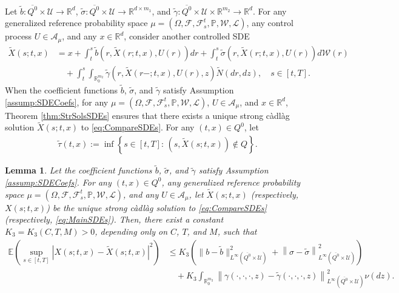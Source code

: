 \documentclass[amscd,amssymb,11pt]{article}
\newtheorem{lemma}[theorem]{Lemma}
\numberwithin{theorem}{section}
\numberwithin{equation}{section}
\begin{document}
Let $\tilde{b}:\overline{Q^{0}}\times\mathcal{U}\rightarrow\mathbb{R}^{d}$, $\widetilde{\sigma}:\overline{Q^{0}}\times\mathcal{U}\rightarrow\mathbb{R}^{d\times m_{1}}$, and $\widetilde{\gamma}:\overline{Q^{0}}\times\mathcal{U}\times\mathbb{R}^{m_{2}}\rightarrow\mathbb{R}^{d}$. For any generalized reference probability space $\mu=(\Omega,\mathscr{F},\mathscr{F}_{s}^{t},\mathbb{P},\mathcal{W},\mathcal{L})$, any control process $U\in\mathcal{A}_{\mu}$, and any $x\in\mathbb{R}^{d}$, consider another controlled SDE
\begin{align}
\widetilde{X}(s;t,x)&=x+\int_{t}^{s}\tilde{b}\left(r,\widetilde{X}(r;t,x),U(r)\right)dr+\int_{t}^{s}\widetilde{\sigma}\left(r,\widetilde{X}(r;t,x),U(r)\right)d\mathcal{W}(r)\nonumber\\
\label{eq:CompareSDEs} &\quad +\int_{t}^{s}\int_{\mathbb{R}^{m_{2}}_{0}}\widetilde{\gamma}\left(r,\widetilde{X}(r-;t,x),U(r),z\right)\widetilde{N}(dr,dz),\quad s\in[t,T].
\end{align}
When the coefficient functions $\tilde{b}$, $\widetilde{\sigma}$, and $\widetilde{\gamma}$ satisfy Assumption \ref{assump:SDECoefs}, for any $\mu=(\Omega,\mathscr{F},\mathscr{F}_{s}^{t},\mathbb{P},\mathcal{W},\mathcal{L})$, $U\in\mathcal{A}_{\mu}$, and $x\in\mathbb{R}^{d}$, Theorem \ref{thm:StrSolsSDEs} ensures that there exists a unique strong c\`{a}dl\`{a}g solution $\widetilde{X}(s;t,x)$ to \eqref{eq:CompareSDEs}. For any $(t,x)\in Q^{0}$, let
\begin{align*}
\widetilde{\tau}(t,x):=\inf\left\{s\in[t,T]:\,\left(s,\widetilde{X}(s;t,x)\right)\not\in Q\right\}.
\end{align*}
\begin{lemma}\label{lem:CompStrSols}
Let the coefficient functions $\tilde{b}$, $\widetilde{\sigma}$, and $\widetilde{\gamma}$ satisfy Assumption \ref{assump:SDECoefs}. For any $(t,x)\in Q^{0}$, any generalized reference probability space $\mu=(\Omega,\mathscr{F},\mathscr{F}_{s}^{t},\mathbb{P},\mathcal{W},\mathcal{L})$, and any $U\in\mathcal{A}_{\mu}$, let $\widetilde{X}(s;t,x)$ (respectively, $X(s;t,x)$) be the unique strong c\`{a}dl\`{a}g solution to \eqref{eq:CompareSDEs} (respectively, \eqref{eq:MainSDEs}). Then, there exist a constant $K_{3}=K_{3}(C,T,M)>0$, depending only on $C$, $T$, and $M$, such that
\begin{align*}
\mathbb{E}\left(\sup_{s\in[t,T]}\left|X(s;t,x)-\widetilde{X}(s;t,x)\right|^{2}\right)&\leq K_{3}\left(\big\|b-\tilde{b}\big\|_{L^{\infty}(\overline{Q^{0}}\times\mathcal{U})}^{2}+\left\|\sigma-\widetilde{\sigma}\right\|_{L^{\infty}(\overline{Q^{0}}\times\mathcal{U})}^{2}\right)\\
&\quad +K_{3}\int_{\mathbb{R}^{m_{2}}_{0}}\left\|\gamma(\cdot,\cdot,\cdot,z)-\widetilde{\gamma}(\cdot,\cdot,\cdot,z)\right\|_{L^{\infty}(\overline{Q^{0}}\times\mathcal{U})}^{2}\nu(dz).
\end{align*}
\end{lemma}
\end{document}
